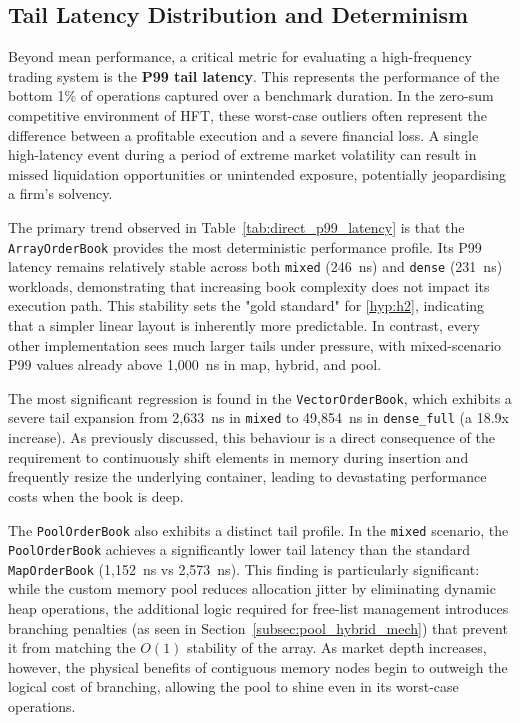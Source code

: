 \subsection{Tail Latency Distribution and Determinism}
\label{subsec:tail_latency}
Beyond mean performance, a critical metric for evaluating a high-frequency trading 
system is the \textbf{P99 tail latency}. 
This represents the performance of the bottom 1\% of operations captured over a 
benchmark duration. 
In the zero-sum competitive environment of HFT, these worst-case outliers often 
represent the difference between a profitable execution and a severe 
financial loss. 
A single high-latency event during a period of extreme market volatility can result 
in missed liquidation opportunities or unintended exposure, potentially 
jeopardising a firm's solvency. 

The primary trend observed in Table~\ref{tab:direct_p99_latency} is that the 
\texttt{ArrayOrderBook} provides the most deterministic performance profile. 
Its P99 latency remains relatively stable across both \texttt{mixed} (246~ns) 
and \texttt{dense} (231~ns) workloads, demonstrating that increasing book 
complexity does not impact its execution path. 
This stability sets the "gold standard" for \ref{hyp:h2}, indicating that a simpler 
linear layout is inherently more predictable. 
In contrast, every other implementation sees much larger tails under pressure, 
with mixed-scenario P99 values already above 1,000~ns in map, hybrid, and pool. 

The most significant regression is found in the \texttt{VectorOrderBook}, which 
exhibits a severe tail expansion from 2,633~ns in \texttt{mixed} to 
49,854~ns in \texttt{dense\_full} (a 18.9x increase). 
As previously discussed, this behaviour is a direct consequence of the 
requirement to continuously shift elements in memory during insertion and 
frequently resize the underlying container, leading to devastating 
performance costs when the book is deep. 

The \texttt{PoolOrderBook} also exhibits a distinct tail profile. 
In the \texttt{mixed} scenario, the \texttt{PoolOrderBook} achieves a 
significantly lower tail latency than the standard \texttt{MapOrderBook} 
(1,152~ns vs 2,573~ns). This finding is particularly significant: while the 
custom memory pool reduces allocation jitter by eliminating dynamic heap 
operations, the additional logic required for free-list management 
introduces branching penalties (as seen in Section~\ref{subsec:pool_hybrid_mech}) 
that prevent it from matching the $O(1)$ stability of the array. As market 
depth increases, however, the physical benefits of contiguous memory nodes 
begin to outweigh the logical cost of branching, allowing the pool to shine 
even in its worst-case operations.


